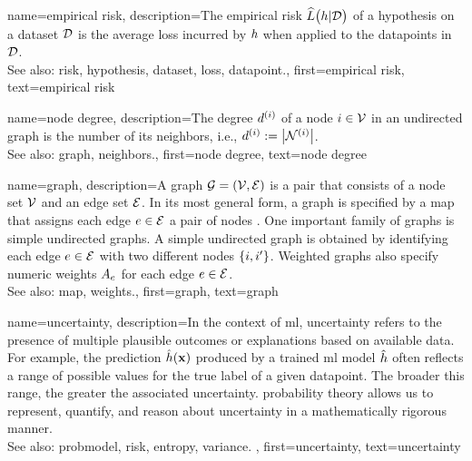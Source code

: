 {name={empirical risk},
  description={The empirical \gls{risk} $\widehat{L}\big(h|\mathcal{D}\big)$ 
  	of a \gls{hypothesis} on a \gls{dataset} $\mathcal{D}$ is the average \gls{loss} incurred 
  	by $h$ when applied to the \glspl{datapoint} in $\mathcal{D}$.
				\\ 
		See also: \gls{risk}, \gls{hypothesis}, \gls{dataset}, \gls{loss}, \gls{datapoint}.},
  first={empirical risk},
  text={empirical risk} 
}

{name={node degree},
	description={The degree $d^{(i)}$ of a node $i \in \mathcal{V}$ 
		in an undirected \gls{graph} is the number of its \gls{neighbors}, i.e., $d^{(i)} := \big|\mathcal{N}^{(i)}\big|$.
					\\ 
		See also: \gls{graph}, \gls{neighbors}.},
	first={node degree},
	text={node degree} 
}

{name={graph},
	description={A graph $\mathcal{G} = \left( \mathcal{V},\mathcal{E} \right)$ is a pair that consists of 
		a node set $\mathcal{V}$ and an edge set $\mathcal{E}$. In its most general form, a graph is 
		specified by a \gls{map} that assigns each edge $e \in \mathcal{E}$ a pair of nodes \cite{RockNetworks}. 
		One important family of graphs is simple undirected graphs. A simple undirected graph 
		is obtained by identifying each edge $e \in \mathcal{E}$ with two different nodes $\{i,i'\}$. 
		Weighted graphs also specify numeric \gls{weights} $A_{e}$ for each 
		edge $e \in \mathcal{E}$.
					\\ 
		See also: \gls{map}, \gls{weights}.},
	first={graph},
	text={graph} 
}

{name={uncertainty},
	description={In the context of \gls{ml}, uncertainty refers to the presence of multiple 
		plausible outcomes or \glspl{explanation} based on available \gls{data}. For example, the 
		\gls{prediction} $\hat{h}({\bf x})$ produced by a trained \gls{ml} \gls{model} $\hat{h}$
	 	often reflects a range of possible values for the true \gls{label} of a given \gls{datapoint}. 
	 	The broader this range, the greater the associated uncertainty. \Gls{probability} theory 
	 	allows us to represent, quantify, and reason about uncertainty in a 
	 	mathematically rigorous manner.
					\\ 
		See also: \gls{probmodel}, \gls{risk}, \gls{entropy}, \gls{variance}. },
	first={uncertainty},
	text={uncertainty}
}

